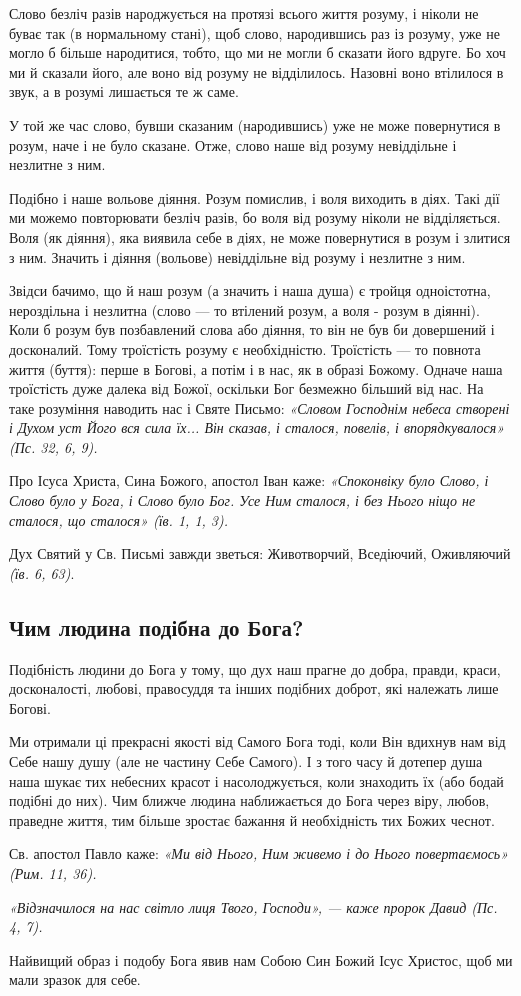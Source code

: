 \documentclass[main.tex]{subfiles}
\begin{document}
Слово безліч разів народжується на протязі всього життя розуму, і ніколи не буває так (в нормальному стані), щоб слово, народившись раз із розуму, уже не могло б більше народитися, тобто, що ми не могли б сказати його вдруге. Бо хоч ми й сказали його, але воно від розуму не відділилось. Назовні воно втілилося в звук, а в розумі лишається те ж саме.

У той же час слово, бувши сказаним (народившись) уже не може повернутися в розум, наче і не було сказане. Отже, слово наше від розуму невіддільне і незлитне з ним.

Подібно і наше вольове діяння. Розум помислив, і воля виходить в діях. Такі дії ми можемо повторювати безліч разів, бо воля від розуму ніколи не відділяється. Воля (як діяння), яка виявила себе в діях, не може повернутися в розум і злитися з ним. Значить і діяння (вольове) невіддільне від розуму і незлитне з ним.

Звідси бачимо, що й наш розум (а значить і наша душа) є тройця одноістотна, нероздільна і незлитна (слово — то втілений розум, а воля - розум в діянні). Коли б розум був позбавлений слова або діяння, то він не був би довершений і досконалий. Тому троїстість розуму є необхідністю. Троїстість — то повнота життя (буття): перше в Богові, а потім і в нас, як в образі Божому. Одначе наша троїстість дуже далека від Божої, оскільки Бог безмежно більший від нас. На таке розуміння наводить нас і Святе Письмо: \emph{«Словом Господнім небеса створені і Духом уст Його вся сила їх... Він сказав, і сталося, повелів, і впорядкувалося» (Пс. 32, 6, 9).}

Про Ісуса Христа, Сина Божого, апостол Іван каже: \emph{«Споконвіку було Слово, і Слово було у Бога, і Слово було Бог. Усе Ним сталося, і без Нього ніщо не сталося, що сталося» (їв. 1, 1, 3).}

Дух Святий у Св. Письмі завжди зветься: Животворчий, Вседіючий, Оживляючий \emph{(їв. 6, 63)}.

\subsection{Чим людина подібна до Бога?}

Подібність людини до Бога у тому, що дух наш прагне до добра, правди, краси, досконалості, любові, правосуддя та інших подібних доброт, які належать лише Богові.

Ми отримали ці прекрасні якості від Самого Бога тоді, коли Він вдихнув нам від Себе нашу душу (але не частину Себе Самого). І з того часу й дотепер душа наша шукає тих небесних красот і насолоджується, коли знаходить їх (або бодай подібні до них). Чим ближче людина наближається до Бога через віру, любов, праведне життя, тим більше зростає бажання й необхідність тих Божих чеснот.

Св. апостол Павло каже: \emph{«Ми від Нього, Ним живемо і до Нього повертаємось» (Рим. 11, 36).}

\emph{«Відзначилося на нас світло лиця Твого, Господи», — каже пророк Давид (Пс. 4, 7).}

Найвищий образ і подобу Бога явив нам Собою Син Божий Ісус Христос, щоб ми мали зразок для себе.
\end{document}
